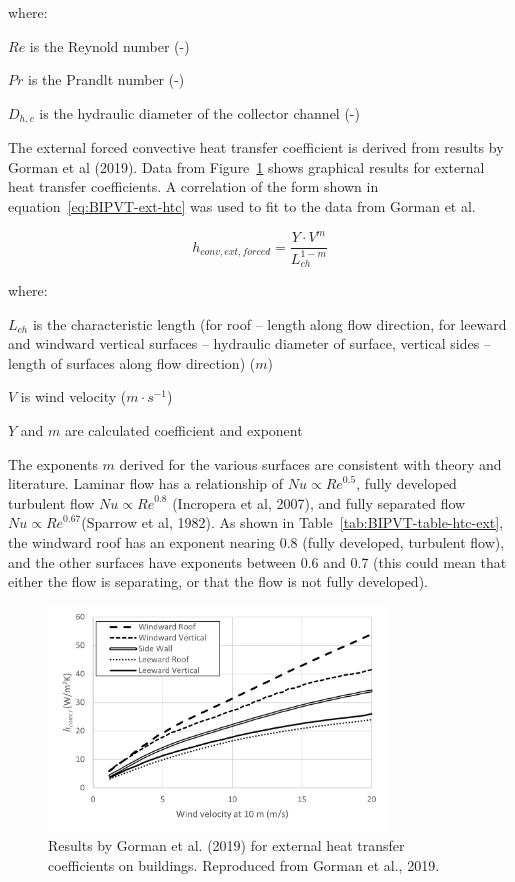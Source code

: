 where:

\(Re\) is the Reynold number (-)

\(Pr\) is the Prandlt number (-)

\(D_{h,c}\) is the hydraulic diameter of the collector channel (-)

The external forced convective heat transfer coefficient is derived from results by Gorman et al (2019). Data from Figure~\ref{fig:BIPVT-external-htc}  shows graphical results for external heat transfer coefficients. A correlation of the form shown in equation~\ref{eq:BIPVT-ext-htc} was used to fit to the data from Gorman et al.

\begin{equation}
h_{conv,ext,forced}=\frac{Y\cdot V^{m}}{L^{1-m}_{ch}}
\label{eq:BIPVT-ext-htc}
\end{equation}

where:

\(L_{ch}\) is the characteristic length (for roof – length along flow direction, for leeward and windward vertical surfaces – hydraulic diameter of surface, vertical sides – length of surfaces along flow direction) (\(m\))

\(V\) is wind velocity (\(m\cdot s^{-1}\))

\(Y\) and \(m\) are calculated coefficient and exponent

The exponents \(m\) derived for the various surfaces are consistent with theory and literature. Laminar flow has a relationship of \(Nu\propto{Re}^{0.5}\), fully developed turbulent flow \(Nu\propto{Re}^{0.8}\) (Incropera et al, 2007), and fully separated flow \(Nu\propto{Re}^{0.67}\)(Sparrow et al, 1982). As shown in Table~\ref{tab:BIPVT-table-htc-ext}, the windward roof has an exponent nearing 0.8 (fully developed, turbulent flow), and the other surfaces have exponents between 0.6 and 0.7 (this could mean that either the flow is separating, or that the flow is not fully developed).

\begin{figure}[hbtp] %
\centering
\includegraphics[width=0.8\textwidth, height=0.8\textheight, keepaspectratio=true]{media/BIPVT_2.png}
\caption{Results by Gorman et al. (2019) for external heat transfer coefficients on buildings. Reproduced from Gorman et al., 2019. \protect \label{fig:BIPVT-external-htc}}
\end{figure}

